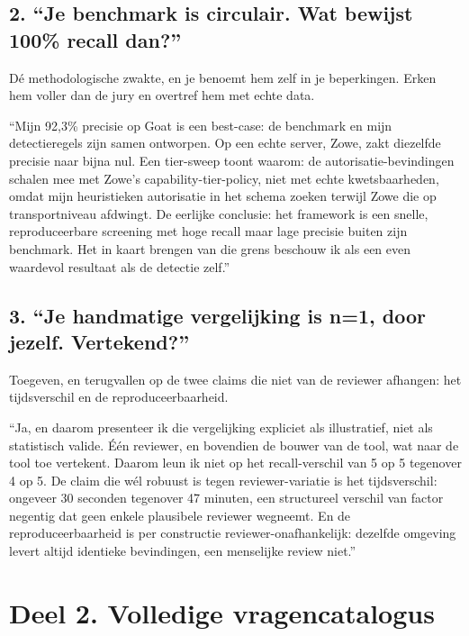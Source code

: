 \documentclass[11pt,a4paper]{article}
\begin{document}
\subsection{2. ``Je benchmark is circulair. Wat bewijst 100\% recall dan?''}
D\'e methodologische zwakte, en je benoemt hem zelf in je beperkingen. Erken hem
voller dan de jury en overtref hem met echte data.

\begin{antwoord}
``Mijn 92,3\% precisie op Goat is een best-case: de benchmark en mijn
detectieregels zijn samen ontworpen. Op een echte server, Zowe, zakt diezelfde
precisie naar bijna nul. Een tier-sweep toont waarom: de autorisatie-bevindingen
schalen mee met Zowe's capability-tier-policy, niet met echte kwetsbaarheden, omdat
mijn heuristieken autorisatie in het schema zoeken terwijl Zowe die op
transportniveau afdwingt. De eerlijke conclusie: het framework is een snelle,
reproduceerbare screening met hoge recall maar lage precisie buiten zijn benchmark.
Het in kaart brengen van die grens beschouw ik als een even waardevol resultaat als
de detectie zelf.''
\end{antwoord}

\subsection{3. ``Je handmatige vergelijking is n=1, door jezelf. Vertekend?''}
Toegeven, en terugvallen op de twee claims die niet van de reviewer afhangen: het
tijdsverschil en de reproduceerbaarheid.

\begin{antwoord}
``Ja, en daarom presenteer ik die vergelijking expliciet als illustratief, niet als
statistisch valide. \'E\'en reviewer, en bovendien de bouwer van de tool, wat naar
de tool toe vertekent. Daarom leun ik niet op het recall-verschil van 5 op 5
tegenover 4 op 5. De claim die w\'el robuust is tegen reviewer-variatie is het
tijdsverschil: ongeveer 30 seconden tegenover 47 minuten, een structureel verschil
van factor negentig dat geen enkele plausibele reviewer wegneemt. En de
reproduceerbaarheid is per constructie reviewer-onafhankelijk: dezelfde omgeving
levert altijd identieke bevindingen, een menselijke review niet.''
\end{antwoord}

\section{Deel 2. Volledige vragencatalogus}
\end{document}
